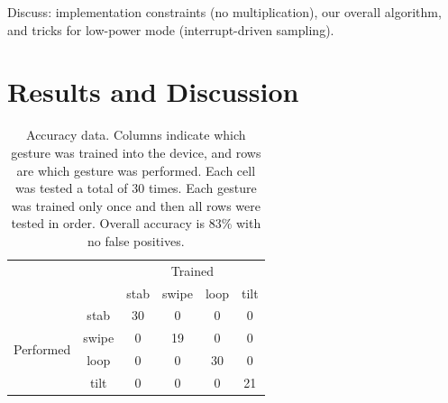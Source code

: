 \documentclass[12pt]{article}
\begin{document}
Discuss: implementation constraints (no multiplication), our overall algorithm,
and tricks for low-power mode (interrupt-driven sampling).

\section{Results and Discussion}

\begin{table}[h!]
\begin{center}
    \begin{tabular}{cc|cccc}
    & & \multicolumn{4}{c}{Trained} \\
    & & stab & swipe & loop & tilt \\
    \hline
    \multirow{4}{*}{Performed} & stab & 30 & 0 & 0 & 0  \\
    & swipe & 0 & 19 & 0 & 0 \\
    & loop & 0 & 0 & 30 & 0 \\
    & tilt & 0 & 0 & 0 & 21
    \end{tabular}
    \caption{Accuracy data. Columns indicate which gesture was
    trained into the device, and rows are which gesture was performed. Each
    cell was tested a total of 30 times. Each gesture was trained only once
    and then all rows were tested in order. Overall accuracy is 83\% with no
    false positives.}
    \label{tbl:data}
\end{center}
\end{table}
\end{document}
